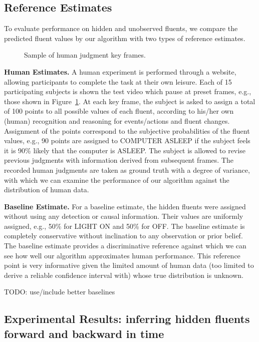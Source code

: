 \documentclass[10pt,journal,letterpaper,compsoc]{IEEEtran}
\begin{document}
\subsection{Reference Estimates}

To evaluate performance on hidden and unobserved fluents, we compare the predicted fluent values by our algorithm with two types of reference estimates.

\begin{figure}[htp]
\centering

\caption{Sample of human judgment key frames. \label{fig:judgmentpoints}}
\end{figure}

{\textbf{Human Estimates.}} A human experiment is performed through a website, allowing participants to complete the task at their own leisure. Each of 15 participating subjects is shown the test video which pause at preset frames, e.g., those shown in Figure~\ref{fig:judgmentpoints}. At each key frame, the subject is asked to assign a total of 100 points to all possible values of each fluent, according to his/her own (human) recognition and reasoning for events/actions and fluent changes. Assignment of the points correspond to the subjective probabilities of the fluent values, e.g., 90 points are assigned to COMPUTER ASLEEP if the subject feels it is 90\% likely that the computer is ASLEEP. The subject is allowed to revise previous judgments with information derived from subsequent frames. The recorded human judgments are taken as ground truth with a degree of variance, with which we can examine the performance of our algorithm against the distribution of human data.


{\textbf{Baseline Estimate.}} For a baseline estimate, the hidden fluents were assigned without using any detection or causal information. Their values are uniformly assigned, e.g., 50\% for LIGHT ON and 50\% for OFF. The baseline estimate is completely conservative without inclination to any observation or prior belief. The baseline estimate provides a discriminative reference against which we can see how well our algorithm approximates human performance. This reference point is very informative given the limited amount of human data (too limited to derive a reliable confidence interval with) whose true distribution is unknown.

TODO: use/include better baselines


\subsection{Experimental Results: inferring hidden fluents forward and backward in time}
\end{document}
